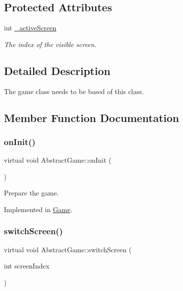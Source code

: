 \subsection*{Protected Attributes}
\begin{DoxyCompactItemize}
\item 
int \mbox{\hyperlink{class_abstract_game_ab5e3089bdd788319c1a240992018c355}{\+\_\+active\+Screen}}
\begin{DoxyCompactList}\small\item\em The index of the visible screen. \end{DoxyCompactList}\end{DoxyCompactItemize}


\subsection{Detailed Description}
The game class needs to be based of this class. 



\subsection{Member Function Documentation}
\mbox{\label{class_abstract_game_ae0bd76d926812f81e5e637ade3b1015f}} 
\subsubsection{\texorpdfstring{on\+Init()}{onInit()}}
{\footnotesize\ttfamily virtual void Abstract\+Game\+::on\+Init (\begin{DoxyParamCaption}{ }\end{DoxyParamCaption})\hspace{0.3cm}{\ttfamily [pure virtual]}}



Prepare the game. 



Implemented in \mbox{\hyperlink{class_game_a91946f348c9334abd083dfebfecdd31d}{Game}}.

\mbox{\label{class_abstract_game_afd50e09c9b23aff40c752990947f07ce}} 
\subsubsection{\texorpdfstring{switch\+Screen()}{switchScreen()}}
{\footnotesize\ttfamily virtual void Abstract\+Game\+::switch\+Screen (\begin{DoxyParamCaption}\item[{int}]{screen\+Index }\end{DoxyParamCaption})\hspace{0.3cm}{\ttfamily [pure virtual]}}



